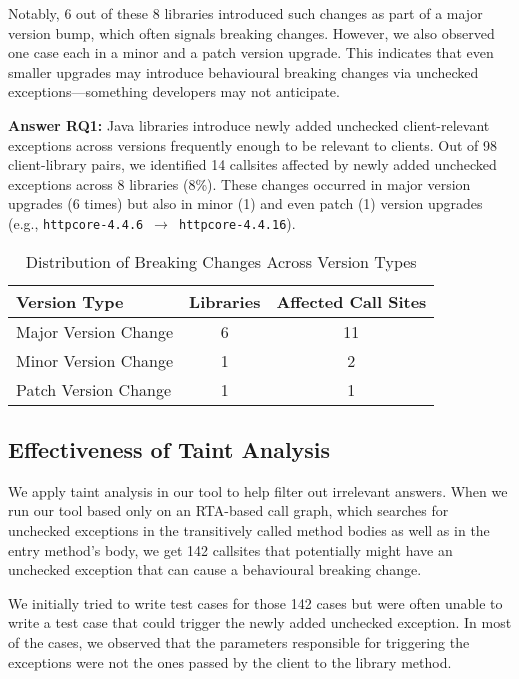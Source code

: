 Notably, 6 out of these 8 libraries introduced such changes as part of a major version bump, which often signals breaking changes. However, we also observed one case each in a minor and a patch version upgrade. This indicates that even smaller upgrades may introduce behavioural breaking changes via unchecked exceptions—something developers may not anticipate.

\vspace{1em}
\begin{tcolorbox}[colback=gray!10, colframe=black]
\textbf{Answer RQ1:} Java libraries introduce newly added unchecked client-relevant exceptions across versions frequently enough to be relevant to clients. Out of 98 client-library pairs, we identified 14 callsites affected by newly added unchecked exceptions across 8 libraries (8\%). These changes occurred in major version upgrades (6 times) but also in minor (1) and even patch (1) version upgrades (e.g., \texttt{httpcore-4.4.6}~$\rightarrow$~\texttt{httpcore-4.4.16}).
\end{tcolorbox}
\vspace{1em}

\begin{table}[h]
\centering
\caption{Distribution of Breaking Changes Across Version Types}
\label{tab:version-distribution}
\begin{tabular}{lcc}
\toprule
\textbf{Version Type} & \textbf{Libraries} & \textbf{Affected Call Sites} \\
\midrule
Major Version Change & 6 & 11 \\
Minor Version Change & 1 & 2 \\
Patch Version Change & 1 & 1 \\
\bottomrule
\end{tabular}
\end{table}

\subsection{Effectiveness of Taint Analysis}

We apply taint analysis in our tool to help filter out irrelevant answers. When we run our tool based only on an RTA-based call graph, which
searches for unchecked exceptions in the transitively called method bodies as well as in the entry method's body, we get
142 callsites that potentially might have an unchecked exception that can cause a behavioural breaking change.

We initially tried to write test cases for those 142 cases but were often unable to write a test case that could trigger
the newly added unchecked exception. In most of the cases, we observed that the parameters responsible for triggering the 
exceptions were not the ones passed by the client to the library method.

